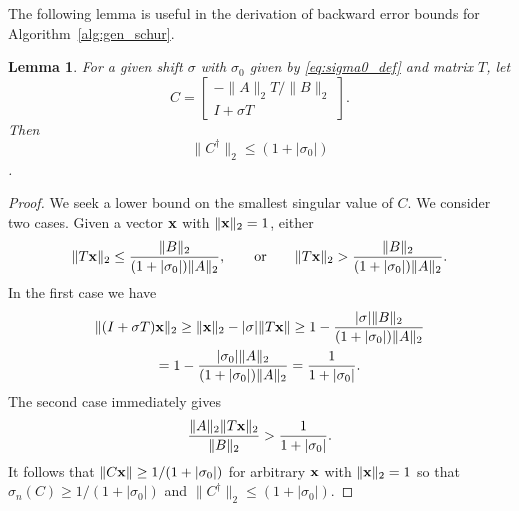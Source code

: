 \documentclass[12pt]{article}
\def\vec#1{{\bf #1}}
\newtheorem{lemma}{Lemma}
\begin{document}
The following lemma is useful in the derivation of backward error
bounds for Algorithm~\ref{alg:gen_schur}.
\begin{lemma}
  \label{lm:pseudo_inv}
  For a given shift $\sigma$ with $\sigma_0$ given by
  \eqref{eq:sigma0_def} and matrix $T$, let
  \begin{equation*}
    C
    =
    \begin{bmatrix}
      -\|A\|_2 T / \|B\|_2 \\ I + \sigma T
    \end{bmatrix}.
  \end{equation*}
  Then
  \begin{equation*}
    \|C^{\dagger}\|_2\leq (1+|\sigma_0|)
  \end{equation*}.
\end{lemma}
\begin{proof}
  We seek a lower bound on the smallest singular value of $C$.  We
  consider two cases.  Given a vector $\vec{x}$ with
  $\|\vec{x}\|_2 = 1$, either
  \begin{equation*}
    \|T\vec{x}\|_2 \leq \frac{\|B\|_2}{(1+|\sigma_0|)\|A\|_2},
    \qquad\mbox{or}\qquad
    \|T\vec{x}\|_2 > \frac{\|B\|_2}{(1+|\sigma_0|)\|A\|_2}.
  \end{equation*}
  In the first case we have
  \begin{multline*}
    \|(I + \sigma T) \vec{x}\|_2
    \geq \|\vec{x}\|_2 - |\sigma| \|T\vec{x}\|
    \geq 1 - \frac{|\sigma| \|B\|_2}{(1+|\sigma_0|)\|A\|_2}\\
    = 1 - \frac{|\sigma_0| \|A\|_2}{(1+|\sigma_0|)\|A\|_2}
    = \frac{1}{1+|\sigma_0|}.
  \end{multline*}
  The second case immediately gives
  \begin{equation*}
    \frac{\|A\|_2\|T\vec{x}\|_2}{\|B\|_2}  > \frac{1}{1+|\sigma_0|}.
  \end{equation*}
  It follows that $\|C\vec{x}\| \geq 1/(1+|\sigma_0|)$ for arbitrary
  $\vec{x}$ with $\|\vec{x}\|_2=1$ so that
  $\sigma_n(C)\geq 1/(1+|\sigma_0|)$ and
  $\|C^{\dagger}\|_2\leq (1+|\sigma_0|)$.
\end{proof}
\end{document}
